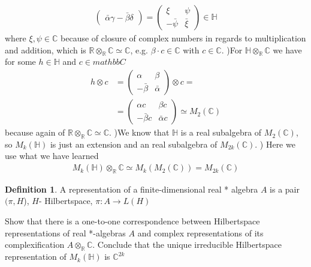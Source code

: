 \documentclass[a4paper]{article}
\newcounter{exercise}
\newenvironment{MyExercise}%
{\begin{mdframed}[style=exercisestyle]}{\end{mdframed}}
\theoremstyle{definition}
\newtheorem{definition}{Definition}
\theoremstyle{definition}
\theoremstyle{definition}
\theoremstyle{theorem}
\theoremstyle{theorem}
\theoremstyle{theorem}
\begin{document}
\begin{MyExercise}
\begin{align}
\begin{pmatrix}
            \bar{\alpha}\gamma-\bar{\beta}\delta
        \end{pmatrix} =
        \begin{pmatrix}
            \xi& \psi\\
            -\bar{\psi} & \bar{\xi}
        \end{pmatrix} \in \mathbb{H}
    \end{align}
    where $\xi, \psi \in \mathbb{C}$ because of closure of complex numbers
    in regards to multiplication and addition, which is $\mathbb{R}
    \otimes_{\mathbb{R}}\mathbb{C} \simeq \mathbb{C}$, e.g. $\beta \cdot c
    \in \mathbb{C}$ with $c \in \mathbb{C}$.
    )For $\mathbb{H}\otimes_\mathbb{R} \mathbb{C}$ we have for some $h \in
    \mathbb{H}$ and $c \in mathbb{C}$
    \begin{align}
        h\otimes c &=
        \begin{pmatrix}
            \alpha & \beta \\
            -\bar{\beta} & \bar{\alpha}
        \end{pmatrix}\otimes c = \\
        &=
        \begin{pmatrix}
            \alpha c & \beta c \\
            -\bar{\beta} c & \bar{\alpha} c
        \end{pmatrix} \simeq M_2(\mathbb{C})
    \end{align}
    because again of $\mathbb{R} \otimes_\mathbb{R} \mathbb{C} \simeq
    \mathbb{C}$.
    )We know that $\mathbb{H}$ is a real subalgebra of $M_2(\mathbb{C})$,
    so $M_k(\mathbb{H})$ is just an extension and an real subalgebra of
    $M_{2k}(\mathbb{C})$.
    ) Here we use what we have learned
    \begin{align}
        M_k(\mathbb{H})\otimes_\mathbb{R} \mathbb{C} \simeq
        M_k(M_2(\mathbb{C})) = M_{2k}(\mathbb{C})
    \end{align}
\end{MyExercise}
\begin{definition}
    A representation of a finite-dimensional real * algebra $A$ is a pair $(\pi
    , H$), $H$- Hilbertspace, $\pi : A \rightarrow L(H)$
\end{definition}
\begin{MyExercise}
    Show that there is a one-to-one correspondence between Hilbertspace
    representations of real *-algebras $A$ and complex representations of its
    complexification $A\otimes _\mathbb{R} \mathbb{C}$. Conclude that the
    unique irreducible Hilbertspace representation of $M_k(\mathbb{H})$ is
    $\mathbb{C}^{2k}$
\end{MyExercise}
\end{document}
